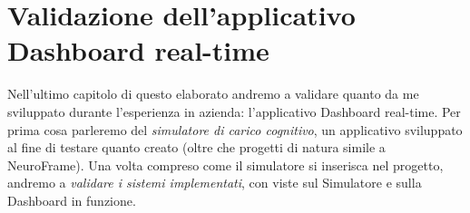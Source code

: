 \chapter{Validazione dell’applicativo Dashboard real-time}
Nell'ultimo capitolo di questo elaborato andremo a validare quanto da me sviluppato durante l'esperienza in azienda: l'applicativo Dashboard real-time.\newline
Per prima cosa parleremo del \emph{simulatore di carico cognitivo}, un applicativo sviluppato al fine di testare quanto creato (oltre che progetti di natura simile a NeuroFrame).\newline
Una volta compreso come il simulatore si inserisca nel progetto, andremo a \emph{validare i sistemi implementati}, con viste sul Simulatore e sulla Dashboard in funzione.